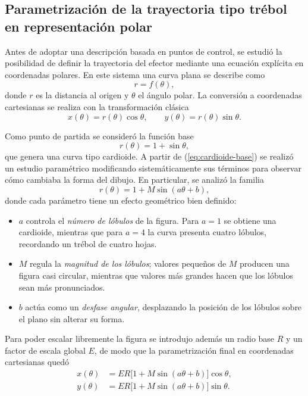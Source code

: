 \documentclass[11pt,a4paper]{article}
\begin{document}
\subsection{Parametrización de la trayectoria tipo trébol en representación polar}

Antes de adoptar una descripción basada en puntos de control, se estudió la posibilidad de definir la trayectoria del efector mediante una ecuación explícita en coordenadas polares. En este sistema una curva plana se describe como
\[
r = f(\theta),
\]
donde $r$ es la distancia al origen y $\theta$ el ángulo polar. La conversión a coordenadas cartesianas se realiza con la transformación clásica
\begin{equation}
x(\theta) = r(\theta)\cos\theta,\qquad
y(\theta) = r(\theta)\sin\theta.
\label{eq:polar-cartesiano}
\end{equation}

Como punto de partida se consideró la función base
\begin{equation}
r(\theta) = 1 + \sin\theta,
\label{eq:cardioide-base}
\end{equation}
que genera una curva tipo cardioide. A partir de (\ref{eq:cardioide-base}) se realizó un estudio paramétrico modificando sistemáticamente sus términos para observar cómo cambiaba la forma del dibujo. En particular, se analizó la familia
\begin{equation}
r(\theta) = 1 + M \sin(a\theta + b),
\label{eq:r-general}
\end{equation}
donde cada parámetro tiene un efecto geométrico bien definido:

\begin{itemize}
  \item $a$ controla el \emph{número de lóbulos} de la figura. Para $a=1$ se obtiene una cardioide, mientras que para $a=4$ la curva presenta cuatro lóbulos, recordando un trébol de cuatro hojas.
  \item $M$ regula la \emph{magnitud de los lóbulos}; valores pequeños de $M$ producen una figura casi circular, mientras que valores más grandes hacen que los lóbulos sean más pronunciados.
  \item $b$ actúa como un \emph{desfase angular}, desplazando la posición de los lóbulos sobre el plano sin alterar su forma.
\end{itemize}

Para poder escalar libremente la figura se introdujo además un radio base $R$ y un factor de escala global $E$, de modo que la parametrización final en coordenadas cartesianas quedó
\begin{align}
x(\theta) &= E R\bigl[1 + M\sin(a\theta + b)\bigr]\cos\theta, \label{eq:x-polar}\\
y(\theta) &= E R\bigl[1 + M\sin(a\theta + b)\bigr]\sin\theta. \label{eq:y-polar}
\end{align}
\end{document}
